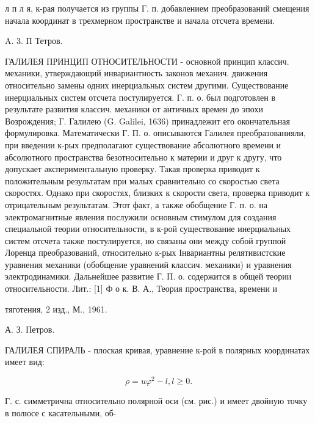 \documentclass[10pt]{article}
\begin{document}
л п л я, к-рая получается из группы Г. п. добавлением преобразований смещения начала координат в трехмерном пространстве и начала отсчета времени.



A. 3. П Тетров.



ГАЛИЛЕЯ ПРИНЦИП ОТНОСИТЕЛЬНОСТИ - основной принцип классич. механики, утверждающий инвариантность законов механич. движения относительно замены одних инерциальных систем другими. Существование инерциальных систем отсчета постулируется. Г. п. о. был подготовлен в результате развития классич. механики от античных времен до эпохи Возрождения; Г. Галилею (G. Galilei, 1636) принадлежит его окончательная формулировка. Математически Г. П. о. описываются Галилея преобразованияли, при введении к-рых предполагают существование абсолютного времени и абсолютного пространства безотносительно к материи и друг к другу, что допускает әкспериментальную проверку. Такая проверка приводит к положительным результатам при малых сравнительно со скоростью света скоростях. Однако при скоростях, близких к скорости света, проверка приводит к отрицательным результатам. Этот факт, а также обобщение Г. п. о. на электромагнитные явления послужили основным стимулом для создания специальной теории относительности, в к-рой существование инерциальных систем отсчета также постулируется, но связаны они между собой группой Лоренца преобразований, относительно к-рых Інвариантны релятивистские уравнения механики (обобщение уравнений классич. механики) и уравнения электродинамики. Дальнейшее развитие Г. П. о. содержится в общей теории относительности. Лит.: [1] Ф о к. В. А., Теория пространства, времени и

тяготения, 2 изд., М., 1961.

А. З. Петров.



ГАЛИЛЕЯ СПИРАЛЬ - плоская кривая, уравнение к-рой в полярных координатах имеет вид:



\[

\rho=u \varphi^{2}-l, l \geqslant 0 .

\]



Г. с. симметрична относительно полярной оси (см. рис.) и имеет двойную точку в полюсе с касательными, об-
\end{document}
